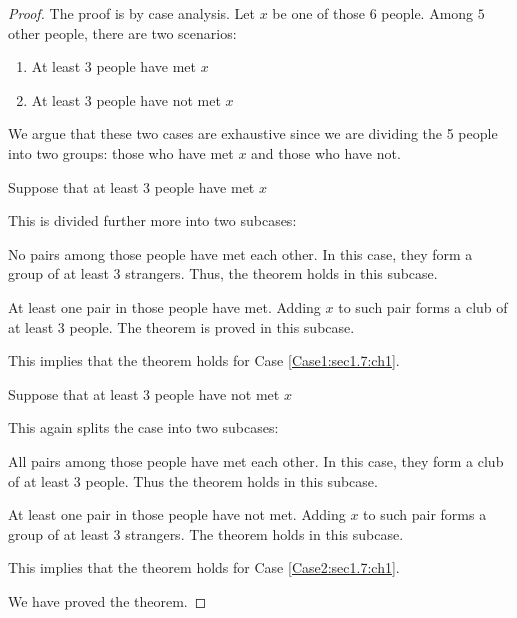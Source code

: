 \begin{proof}
    The proof is by case analysis. Let $x$ be one of those $6$ people. Among $5$ other people,
    there are two scenarios:
    \begin{enumerate}
        \item At least $3$ people have met $x$
        \item At least $3$ people have not met $x$
    \end{enumerate}
    We argue that these two cases are exhaustive since we are dividing the 5 people
    into two groups: those who have met $x$ and those who have not.
    \begin{casesp}
        \item \label{Case1:sec1.7:ch1} Suppose that at least $3$ people have met $x$
        
        This is divided further more into two subcases:

        \begin{casesp}
            \item No pairs among those people have met each other. In this case,
            they form a group of at least $3$ strangers. Thus, the theorem holds in this
            subcase.
            \item At least one pair in those people have met. Adding $x$ to such pair
            forms a club of at least $3$ people. The theorem is proved in this subcase.
        \end{casesp}

        This implies that the theorem holds for Case \ref{Case1:sec1.7:ch1}.

        \item \label{Case2:sec1.7:ch1} Suppose that at least $3$ people have not met $x$
        
        This again splits the case into two subcases:

        \begin{casesp}
            \item All pairs among those people have met each other. In this case,
            they form a club of at least $3$ people. Thus the theorem holds in this subcase.
            \item At least one pair in those people have not met. Adding $x$ to
            such pair forms a group of at least $3$ strangers. The theorem holds in this subcase.
        \end{casesp}

        This implies that the theorem holds for Case \ref{Case2:sec1.7:ch1}.

    \end{casesp}
    We have proved the theorem.
\end{proof}
